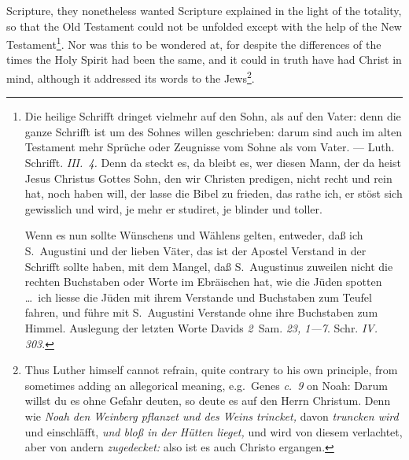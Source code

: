 \documentclass[12pt]{book}
\newcommand{\opage}[1]{\marginnote{\footnotesize\textit{[#1]}}}
\begin{document}
Scripture, they nonetheless wanted Scripture explained in the light of the
totality, so that the Old Testament could not be unfolded except with the
help of the New Testament\footnote{Die heilige Schrifft dringet
vielmehr auf den Sohn, als auf den Vater: denn die ganze Schrifft ist um des
Sohnes willen geschrieben: darum sind auch im alten Testament mehr Sprüche
oder Zeugnisse vom Sohne als vom Vater. --- Luth. Schrifft. \textit{III.~4.}
Denn da steckt es, da bleibt es, wer diesen Mann, der da heist Jesus Christus
Gottes Sohn, den wir Christen predigen, nicht recht und rein hat, noch haben
will, der lasse die Bibel zu frieden, das rathe ich, er stöst sich gewisslich
und wird, je mehr er studiret, je blinder und toller.

Wenn es nun sollte Wünschens und Wählens gelten, entweder, daß ich
S.~Augustini und der lieben Väter, das ist der Apostel Verstand in der
Schrifft sollte haben, mit dem Mangel, daß S.~Augustinus zuweilen nicht die
rechten Buchstaben oder Worte im Ebräischen hat, wie die Jüden spotten
\ldots\ ich liesse die Jüden mit ihrem Verstande und Buchstaben zum Teufel
fahren, und führe mit S.~Augustini Verstande ohne ihre Buchstaben zum Himmel.
Auslegung der letzten Worte Davids \textit{2}~Sam. \textit{23, 1---7}. Schr.
\textit{IV. 303}.}. Nor was this to be wondered at, for despite the
\opage{66}\setcounter{footnote}{0}%
differences of the times the Holy Spirit had been the same, and it could in
truth have had Christ in mind, although it addressed its words to the
Jews\footnote{Thus Luther himself cannot refrain, quite contrary to his own
principle, from sometimes adding an allegorical meaning, e.g.\ Genes
\textit{c.~9} on Noah: Darum willst du es ohne Gefahr deuten, so deute es auf
den Herrn Christum. Denn wie \emph{Noah den Weinberg pflanzet und des Weins
trincket,} davon \emph{truncken wird} und einschläfft, \emph{und bloß in der
Hütten lieget,} und wird von diesem verlachtet, aber von andern
\emph{zugedecket:} also ist es auch Christo ergangen.}.
\end{document}
